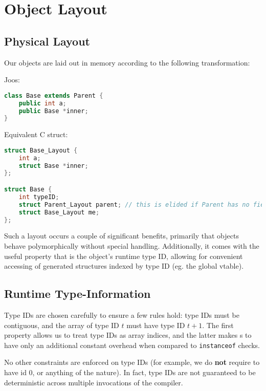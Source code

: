 \documentclass{article}
\begin{document}
\section{Object Layout}
\subsection{Physical Layout}
Our objects are laid out in memory according to the following transformation:

Joos:
\begin{lstlisting}[language=java]
class Base extends Parent {
    public int a;
    public Base *inner;
}
\end{lstlisting}

Equivalent C struct:
\begin{lstlisting}[language=C++]
struct Base_Layout {
    int a;
    struct Base *inner;
};

struct Base {
    int typeID;
    struct Parent_Layout parent; // this is elided if Parent has no fields
    struct Base_Layout me;
};
\end{lstlisting}

Such a layout occurs a couple of significant benefits, primarily that objects behave polymorphically without special
handling. Additionally, it comes with the useful property that  is the object's runtime type ID,
allowing for convenient accessing of generated structures indexed by type ID (eg. the global vtable).



\subsection{Runtime Type-Information}
Type IDs are chosen carefully to ensure a few rules hold: type IDs must be contiguous, and the array of type ID $t$ must
have type ID $t + 1$. The first property allows us to treat type IDs as array indices, and the latter makes
s to have only an additional constant overhead when compared to \texttt{instanceof} checks.

No other constraints are enforced on type IDs (for example, we do \textbf{not} require  to have id 0, or
anything of the nature). In fact, type IDs are not guaranteed to be deterministic across multiple invocations of the
compiler.
\end{document}
